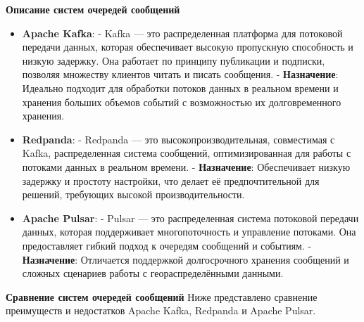 \textbf{Описание систем очередей сообщений}
\begin{itemize}
    \item \textbf{Apache Kafka}:
            - Kafka — это распределенная платформа для потоковой передачи данных, которая обеспечивает высокую пропускную способность и низкую задержку. Она работает по принципу публикации и подписки, позволяя множеству клиентов читать и писать сообщения.
            - \textbf{Назначение}: Идеально подходит для обработки потоков данных в реальном времени и хранения больших объемов событий с возможностью их долговременного хранения.
    \item \textbf{Redpanda}:
            - Redpanda — это высокопроизводительная, совместимая с Kafka, распределенная система сообщений, оптимизированная для работы с потоками данных в реальном времени.
            - \textbf{Назначение}: Обеспечивает низкую задержку и простоту настройки, что делает её предпочтительной для решений, требующих высокой производительности. 
    \item \textbf{Apache Pulsar}:
            - Pulsar — это распределенная система потоковой передачи данных, которая поддерживает многопоточность и управление потоками. Она предоставляет гибкий подход к очередям сообщений и событиям.
            - \textbf{Назначение}: Отличается поддержкой долгосрочного хранения сообщений и сложных сценариев работы с геораспределёнными данными.
\end{itemize}



\textbf{Сравнение систем очередей сообщений}
Ниже представлено сравнение преимуществ и недостатков Apache Kafka, Redpanda и Apache Pulsar.


